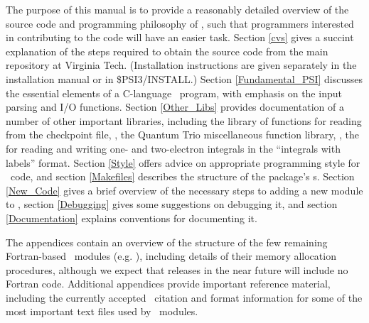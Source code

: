 %
%
%
%

The purpose of this manual is to provide a reasonably detailed
overview of the source code and programming philosophy of \PSIthree,
such that programmers interested in contributing to the code will have
an easier task.  Section \ref{cvs} gives a succint explanation of the
steps required to obtain the source code from the main repository at
Virginia Tech.  (Installation instructions are given separately in the
installation manual or in \$PSI3/INSTALL.)  Section
\ref{Fundamental_PSI} discusses the essential elements of a C-language
\PSIthree\ program, with emphasis on the input parsing and I/O
functions.  Section \ref{Other_Libs} provides documentation of a
number of other important libraries, including the library of
functions for reading from the checkpoint file, ,
the Quantum Trio miscellaneous function library, ,
the  for reading and writing one- and two-electron
integrals in the ``integrals with labels'' format.  Section
\ref{Style} offers advice on appropriate programming style for
\PSIthree\ code, and section \ref{Makefiles} describes the structure
of the package's s.  Section \ref{New_Code} gives a
brief overview of the necessary steps to adding a new module to
\PSIthree, section \ref{Debugging} gives some suggestions on debugging
it, and section \ref{Documentation} explains conventions for
documenting it.

The appendices contain an overview of the structure of the few
remaining Fortran-based \PSIthree\ modules (e.g. ),
including details of their memory allocation procedures, although we
expect that releases in the near future will include no Fortran code.
Additional appendices provide important reference material, including
the currently accepted \PSIthree\ citation and format information for
some of the most important text files used by \PSIthree\ modules.
